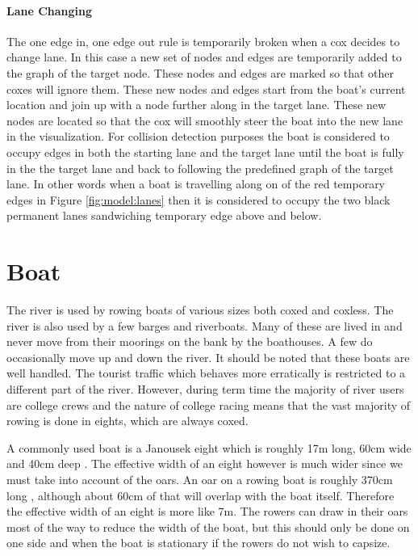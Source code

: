       \paragraph{Lane Changing}
      The one edge in, one edge out rule is temporarily broken when a cox decides to change lane. In this case a new set of nodes and edges are temporarily added to the graph of the target node. These nodes and edges are marked so that other coxes will ignore them. These new nodes and edges start from the boat's current location and join up with a node further along in the target lane. These new nodes are located so that the cox will smoothly steer the boat into the new lane in the visualization. For collision detection purposes the boat is considered to occupy edges in both the starting lane and the target lane until the boat is fully in the the target lane and back to following the predefined graph of the target lane. In other words when a boat is travelling along on of the red temporary edges in Figure \ref{fig:model:lanes} then it is considered to occupy the two black permanent lanes sandwiching temporary edge above and below.

    \section{Boat}
      The river is used by rowing boats
      of various sizes both coxed and coxless. The river is also used by a few barges and riverboats. Many of these
      are lived in and never move from their moorings on the bank by the boathouses. A few do occasionally move
      up and down the river. It should be noted that these boats are well
      handled. The tourist traffic which behaves more erratically is
      restricted to a different part of the river. 
      However, during term time the majority of river users are college crews and the nature of
      college racing means that the vast majority of rowing is done in eights, which are always coxed. 
      
      A commonly used boat is a Janousek eight which is roughly 17m long, 60cm wide and 40cm deep
      \cite{Janousek}. The effective width of an eight however is much wider
      since we must take into account of the oars. An oar on a rowing boat
      is roughly 370cm long \cite{Concept2}, although about 60cm of that
      will overlap with the boat itself. Therefore the effective width of an
      eight is more like 7m. The rowers can draw in their oars most of the
      way to reduce the width of the boat, but this should only be done on
      one side and when the boat is stationary if the rowers do not wish to
      capsize.

